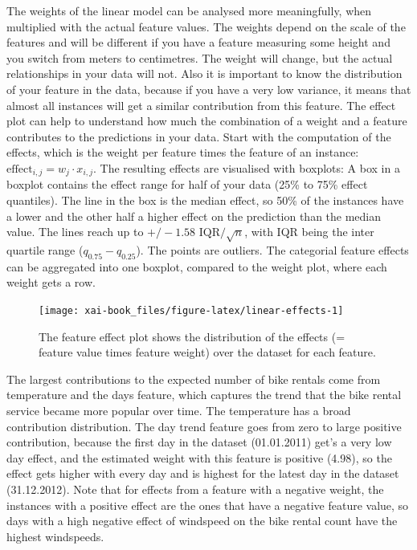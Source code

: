 \documentclass[12pt,]{krantz}
\theoremstyle{definition}
\theoremstyle{definition}
\theoremstyle{definition}
\theoremstyle{remark}
\begin{document}
The weights of the linear model can be analysed more meaningfully, when
multiplied with the actual feature values. The weights depend on the
scale of the features and will be different if you have a feature
measuring some height and you switch from meters to centimetres. The
weight will change, but the actual relationships in your data will not.
Also it is important to know the distribution of your feature in the
data, because if you have a very low variance, it means that almost all
instances will get a similar contribution from this feature. The effect
plot can help to understand how much the combination of a weight and a
feature contributes to the predictions in your data. Start with the
computation of the effects, which is the weight per feature times the
feature of an instance: \(\text{effect}_{i,j} = w_{j} \cdot x_{i,j}\).
The resulting effects are visualised with boxplots: A box in a boxplot
contains the effect range for half of your data (25\% to 75\% effect
quantiles). The line in the box is the median effect, so 50\% of the
instances have a lower and the other half a higher effect on the
prediction than the median value. The lines reach up to
\(+/- 1.58 \text{ IQR} / \sqrt{n}\), with IQR being the inter quartile
range (\(q_{0.75} - q_{0.25}\)). The points are outliers. The categorial
feature effects can be aggregated into one boxplot, compared to the
weight plot, where each weight gets a row.

\begin{figure}

{\centering \texttt{[image: xai-book\_files/figure-latex/linear-effects-1]} 

}

\caption{The feature effect plot shows the distribution of the effects (= feature value times feature weight) over the dataset for each feature.}\label{fig:linear-effects}
\end{figure}

The largest contributions to the expected number of bike rentals come
from temperature and the days feature, which captures the trend that the
bike rental service became more popular over time. The temperature has a
broad contribution distribution. The day trend feature goes from zero to
large positive contribution, because the first day in the dataset
(01.01.2011) get's a very low day effect, and the estimated weight with
this feature is positive (4.98), so the effect gets higher with every
day and is highest for the latest day in the dataset (31.12.2012). Note
that for effects from a feature with a negative weight, the instances
with a positive effect are the ones that have a negative feature value,
so days with a high negative effect of windspeed on the bike rental
count have the highest windspeeds.
\end{document}
